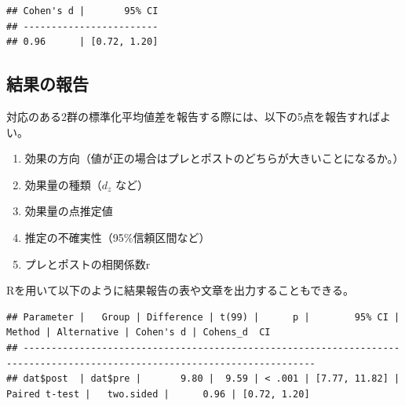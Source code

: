 \documentclass[
  ja=standard, xelatex, base=12pt]{bxjsreport}
\newenvironment{Shaded}{\begin{snugshade}}{\end{snugshade}}
\newcommand{\AttributeTok}[1]{\textcolor[rgb]{0.77,0.63,0.00}{#1}}
\newcommand{\CommentTok}[1]{\textcolor[rgb]{0.56,0.35,0.01}{\textit{#1}}}
\newcommand{\FunctionTok}[1]{\textcolor[rgb]{0.00,0.00,0.00}{#1}}
\newcommand{\NormalTok}[1]{#1}
\newcommand{\SpecialCharTok}[1]{\textcolor[rgb]{0.00,0.00,0.00}{#1}}
\providecommand{\tightlist}{%
  \setlength{\itemsep}{0pt}\setlength{\parskip}{0pt}}
\begin{document}
\begin{verbatim}
## Cohen's d |       95% CI
## ------------------------
## 0.96      | [0.72, 1.20]
\end{verbatim}

\hypertarget{ux7d50ux679cux306eux5831ux544a-4}{%
\subsection{結果の報告}\label{ux7d50ux679cux306eux5831ux544a-4}}

対応のある2群の標準化平均値差を報告する際には、以下の5点を報告すればよい。

\begin{enumerate}
\def\labelenumi{\arabic{enumi}.}
\tightlist
\item
  効果の方向（値が正の場合はプレとポストのどちらが大きいことになるか。）
\item
  効果量の種類（\(d_z\) など）
\item
  効果量の点推定値
\item
  推定の不確実性（95\%信頼区間など）
\item
  プレとポストの相関係数r
\end{enumerate}

Rを用いて以下のように結果報告の表や文章を出力することもできる。

\begin{Shaded}
\end{Shaded}

\begin{verbatim}
## Parameter |   Group | Difference | t(99) |      p |        95% CI |        Method | Alternative | Cohen's d | Cohens_d  CI
## --------------------------------------------------------------------------------------------------------------------------
## dat$post  | dat$pre |       9.80 |  9.59 | < .001 | [7.77, 11.82] | Paired t-test |   two.sided |      0.96 | [0.72, 1.20]
\end{verbatim}

\begin{Shaded}
\end{Shaded}
\end{document}
